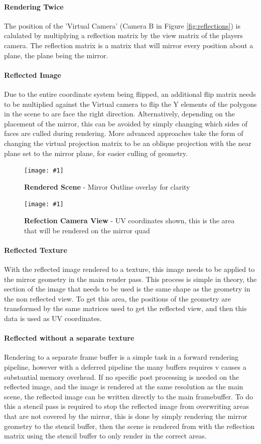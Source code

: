 \documentclass[conference]{acmsiggraph}
\newcommand{\figuremacroW}[4]{
	\begin{figure}[h] %
		\centering
		\texttt{[image: \#1]}
		\caption[#2]{\textbf{#2} - #3}
		\label{fig:#1}
	\end{figure}
}
\begin{document}
\paragraph{Rendering Twice}
The position of the 'Virtual Camera' (Camera B in Figure \ref{fig:reflections}) is calulated by multiplying a reflection matrix by the view matrix of the players camera. The reflection matrix is a matrix that will mirror every position about a plane, the plane being the mirror.

\paragraph{Reflected Image}
Due to the entire coordinate system being flipped, an additional flip matrix needs to be multiplied against the Virtual camera to flip the Y elements of the polygons in the scene to are face the right direction. Alternatively, depending on the placement of the mirror, this can be avoided by simply changing which sides of faces are culled during rendering. More advanced approaches take the form of changing the virtual projection matrix to be an oblique projection with the near plane set to the mirror plane, for easier culling of geometry.

\figuremacroW
{front-Buffer}
{Rendered Scene}
{Mirror Outline overlay for clarity}
{1.0}

\figuremacroW
{ref-Buffer}
{Refection Camera View}
{UV coordinates shown, this is the area that will be rendered on the mirror quad}
{1.0}

\paragraph{Reflected Texture}
With the reflected image rendered to a texture, this image needs to be applied to the mirror geometry in the main render pass.
This process is simple in theory, the section of the image that needs to be used is the same shape as the geometry in the non reflected view.
To get this area, the positions of the geometry are transformed by the same matrices used to get the reflected view, and then this data is used as UV coordinates.

\paragraph{Reflected without a separate texture}
Rendering to a separate frame buffer is a simple task in a forward rendering pipeline, however with a deferred pipeline the many buffers requires v causes a substantial memory overhead.
If no specific post processing is needed on the reflected image, and the image is rendered at the same resolution as the main scene, the reflected image can be written directly to the main framebuffer.
To do this a stencil pass is required to stop the reflected image from overwriting areas that are not covered by the mirror, this is done by simply rendering the mirror geometry to the stencil buffer, then the scene is rendered from with the reflection matrix using the stencil buffer to only render in the correct areas.
\end{document}
